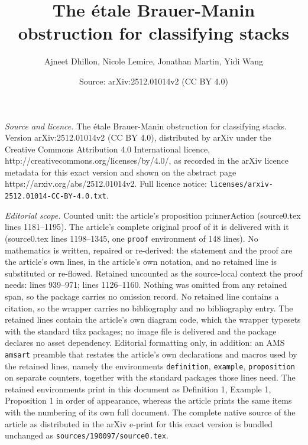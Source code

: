 \documentclass[10pt,a4paper]{amsart}
\title{The \'{e}tale Brauer-Manin obstruction for classifying stacks}
\author{Ajneet Dhillon, Nicole Lemire, Jonathan Martin, Yidi Wang}
\date{Source: arXiv:2512.01014v2 (CC BY 4.0)}
\begin{document}
\maketitle

\noindent\emph{Source and licence.} The \'{e}tale Brauer-Manin obstruction for classifying stacks. Version arXiv:2512.01014v2 (CC BY 4.0), distributed by arXiv under the Creative Commons Attribution 4.0 International licence, http://creativecommons.org/licenses/by/4.0/, as recorded in the arXiv licence metadata for this exact version and shown on the abstract page https://arxiv.org/abs/2512.01014v2. Full licence notice: \texttt{licenses/arxiv-2512.01014-CC-BY-4.0.txt}.\par\smallskip

\noindent\textit{Editorial scope.} Counted unit: the article's proposition p:innerAction (source0.tex lines 1181--1195). The article's complete original proof of it is delivered with it (source0.tex lines 1198--1345, one \texttt{proof} environment of 148 lines). No mathematics is written, repaired or re-derived: the statement and the proof are the article's own lines, in the article's own notation, and no retained line is substituted or re-flowed.  Retained uncounted as the source-local context the proof needs: lines 939--971; lines 1126--1160.  Nothing was omitted from any retained span, so the package carries no omission record.  No retained line contains a citation, so the wrapper carries no bibliography and no bibliography entry.  The retained lines contain the article's own diagram code, which the wrapper typesets with the standard tikz packages; no image file is delivered and the package declares no asset dependency.  Editorial formatting only, in addition: an AMS \texttt{amsart} preamble that restates the article's own declarations and macros used by the retained lines, namely the environments \texttt{definition}, \texttt{example}, \texttt{proposition} on separate counters, together with the standard packages those lines need.  The retained environments print in this document as Definition 1, Example 1, Proposition 1 in order of appearance, whereas the article prints the same items with the numbering of its own full document.  The complete native source of the article as distributed in the arXiv e-print for this exact version is bundled unchanged as \texttt{sources/190097/source0.tex}.
\end{document}
